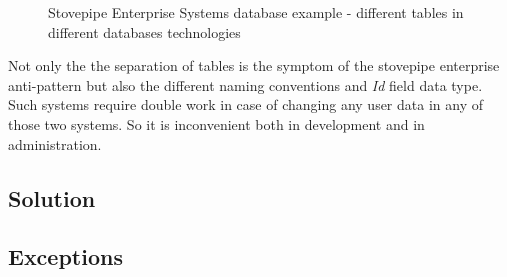 \begin{figure}[htp]
\hfill%
%
\caption[Stovepipe Enterprise Systems database example]{Stovepipe Enterprise Systems database example - different tables in different databases technologies}
\label{fig:DatabaseExample}
\end{figure}

Not only the the separation of tables is the symptom of the stovepipe enterprise anti-pattern but also the different naming conventions and \emph{Id} field data type.
Such systems require double work in case of changing any user data in any of those two systems. So it is inconvenient both in development and in administration.

\subsection{Solution}



\subsection{Exceptions}